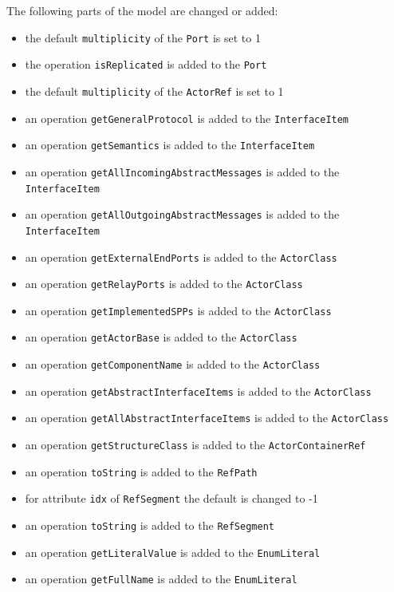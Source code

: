 The following parts of the model are changed or added:
\begin{itemize}
\item the default \texttt{multiplicity} of the \texttt{Port} is set to 1
\item the operation \texttt{isReplicated} is added to the \texttt{Port}
\item the default \texttt{multiplicity} of the \texttt{ActorRef} is set to 1
\item an operation \texttt{getGeneralProtocol} is added to the \texttt{InterfaceItem}
\item an operation \texttt{getSemantics} is added to the \texttt{InterfaceItem}
\item an operation \texttt{getAllIncomingAbstractMessages} is added to the \texttt{InterfaceItem}
\item an operation \texttt{getAllOutgoingAbstractMessages} is added to the \texttt{InterfaceItem}
\item an operation \texttt{getExternalEndPorts} is added to the \texttt{ActorClass}
\item an operation \texttt{getRelayPorts} is added to the \texttt{ActorClass}
\item an operation \texttt{getImplementedSPPs} is added to the \texttt{ActorClass}
\item an operation \texttt{getActorBase} is added to the \texttt{ActorClass}
\item an operation \texttt{getComponentName} is added to the \texttt{ActorClass}
\item an operation \texttt{getAbstractInterfaceItems} is added to the \texttt{ActorClass}
\item an operation \texttt{getAllAbstractInterfaceItems} is added to the \texttt{ActorClass}
\item an operation \texttt{getStructureClass} is added to the \texttt{ActorContainerRef}
\item an operation \texttt{toString} is added to the \texttt{RefPath}
\item for attribute \texttt{idx} of \texttt{RefSegment} the default is changed to -1
\item an operation \texttt{toString} is added to the \texttt{RefSegment}
\item an operation \texttt{getLiteralValue} is added to the \texttt{EnumLiteral}
\item an operation \texttt{getFullName} is added to the \texttt{EnumLiteral}
\end{itemize}


